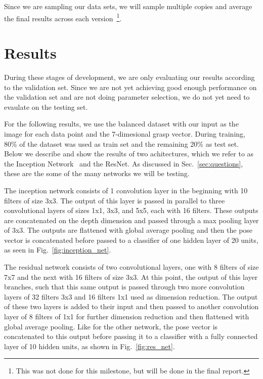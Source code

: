 \documentclass[letterpaper, 10 pt, conference]{../ieeeconf}
\newcommand{\sref}[1]{Sec.~\ref{#1}} %
\newcommand{\figref}[1]{Fig.~\ref{#1}} %
\begin{document}
Since we are sampling our data sets, we will sample multiple copies and average the final results across each version~\footnote{This was not done for this milestone, but will be done in the final report.}.

\section{Results}
\label{sec:results}

During these stages of development, we are only evaluating our results according to the validation set. 
Since we are not yet achieving good enough performance on the validation set and are not doing parameter selection, we do not yet need to evaulate on the testing set. 

For the following results, we use the balanced dataset with our input as the image for each data point and the 7-dimesional grasp vector. 
During training, 80\% of the dataset was used as train set and the remaining 20\% as test set. 
Below we describe and show the results of two achitectures, which we refer to as the Inception Network~\cite{szegedy2015going} and the ResNet.
As discussed in \sref{sec:questions}, these are the some of the many networks we will be testing.  

The inception network consists of 1 convolution layer in the beginning with 10 filters of size 3x3. 
The output of this layer is passed in parallel to three convolutional layers of sizes 1x1, 3x3, and 5x5, each with 16 filters. 
These outputs are concatenated on the depth dimension and passed through a max pooling layer of 3x3. 
The outputs are flattened with global average pooling and then the pose vector is concatenated before passed to a classifier of one hidden layer of 20 units, as seen in \figref{fig:inception_net}. 

The residual network consists of two convolutional layers, one with 8 filters of size 7x7 and the next with 16 filters of size 3x3.
At this point, the output of this layer branches, such that this same output is passed through two more convolution layers of 32 filters 3x3 and 16 filters 1x1 used as dimension reduction. 
The output of these two layers is added to their input and then passed to another convolution layer of 8 filters of 1x1 for further dimension reduction and then flattened with global average pooling. 
Like for the other network, the pose vector is concatenated to this output before passing it to a classifier with a fully connected layer of 10 hidden units, as shown in \figref{fig:res_net}.
 
\end{document}
